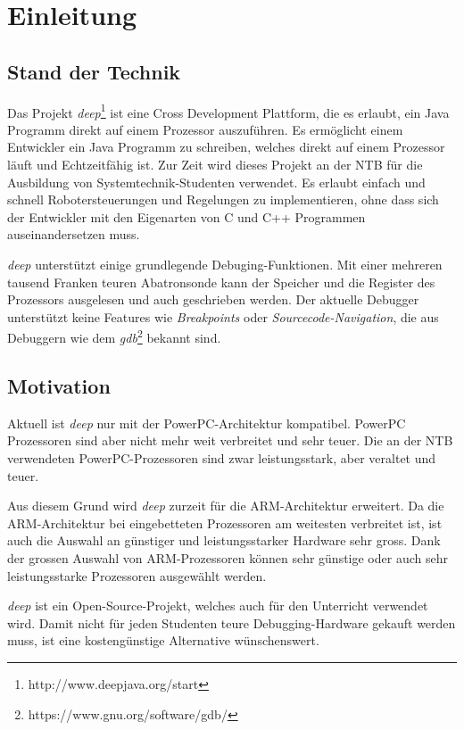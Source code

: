 \chapter{Einleitung}


\section{Stand der Technik}
Das Projekt \textit{deep}\footnote{http://www.deepjava.org/start} ist eine Cross Development Plattform, die es erlaubt, ein Java Programm direkt auf einem Prozessor auszuführen.
Es ermöglicht einem Entwickler ein Java Programm zu schreiben, welches direkt auf einem Prozessor läuft und Echtzeitfähig ist.
Zur Zeit wird dieses Projekt an der NTB für die Ausbildung von Systemtechnik-Studenten verwendet.
Es erlaubt einfach und schnell Robotersteuerungen und Regelungen zu implementieren, ohne dass sich der Entwickler mit den Eigenarten von C und C++ Programmen auseinandersetzen muss.

\textit{deep} unterstützt einige grundlegende Debuging-Funktionen.
Mit einer mehreren tausend Franken teuren Abatronsonde kann der Speicher und die Register des Prozessors ausgelesen und auch geschrieben werden.
Der aktuelle Debugger unterstützt keine Features wie \textit{Breakpoints} oder \textit{Sourcecode-Navigation}, die aus Debuggern wie dem \textit{gdb}\footnote{https://www.gnu.org/software/gdb/} bekannt sind.



\section{Motivation}
Aktuell ist \textit{deep} nur mit der PowerPC-Architektur kompatibel.
PowerPC Prozessoren sind aber nicht mehr weit verbreitet und sehr teuer.
Die an der NTB verwendeten PowerPC-Prozessoren sind zwar leistungsstark, aber veraltet und teuer.

Aus diesem Grund wird \textit{deep} zurzeit für die ARM-Architektur erweitert.
Da die ARM-Architektur bei eingebetteten Prozessoren am weitesten verbreitet ist, ist auch die Auswahl an günstiger und leistungsstarker Hardware sehr gross.
Dank der grossen Auswahl von ARM-Prozessoren können sehr günstige oder auch sehr leistungsstarke Prozessoren ausgewählt werden.

\textit{deep} ist ein Open-Source-Projekt, welches auch für den Unterricht verwendet wird.
Damit nicht für jeden Studenten teure Debugging-Hardware gekauft werden muss, ist eine kostengünstige Alternative wünschenswert.

